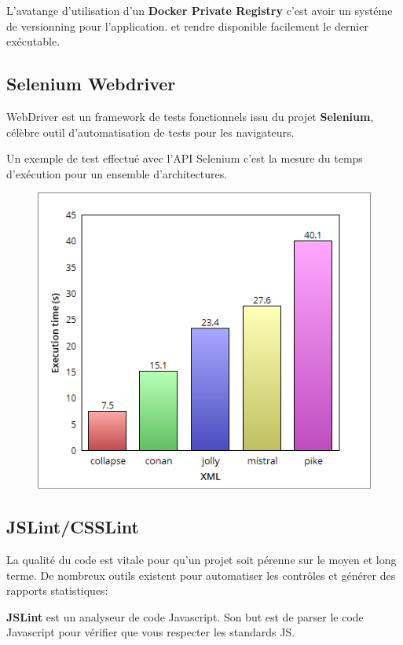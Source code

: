 \documentclass [a4paper,11pt]{article}
\begin{document}
L'avatange d'utilisation d'un \textbf{Docker Private Registry} c'est avoir un systéme de versionning pour l'application. et rendre disponible facilement le dernier exécutable.
\subsection{Selenium Webdriver}
WebDriver est un framework de tests fonctionnels issu du projet \textbf{Selenium}, célèbre outil d'automatisation de tests pour les navigateurs.\newline

Un exemple de test effectué avec l'API Selenium c'est la mesure du temps d'exécution pour un ensemble d'architectures.

\begin{figure}[!h]
\centering
\includegraphics[scale=0.4]{img/benchmark.png}
\end{figure}

\subsection{JSLint/CSSLint}

La qualité du code est vitale pour qu'un projet soit pérenne sur le moyen et long terme. De nombreux outils existent pour automatiser les contrôles et générer des rapports statistiques:\newline

\textbf{JSLint} est un analyseur de code Javascript. Son but est de parser le code Javascript pour vérifier que vous respecter les standards JS.\newline
\end{document}
